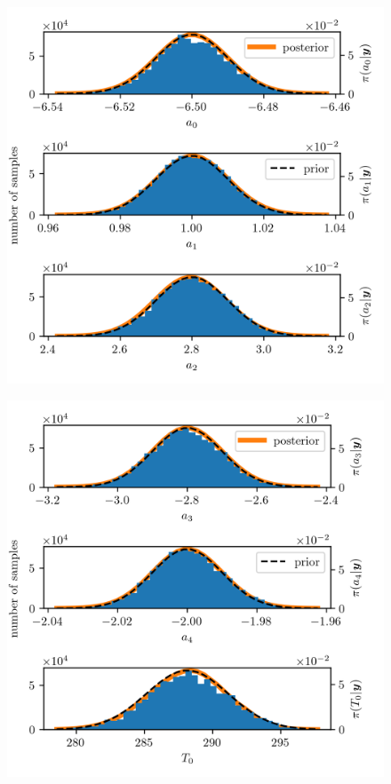 \begin{figure}[ht!]
	\centering
	\includegraphics{PHdPTPost2.png}
	\caption[]{}
	\label{fig:PostHistTT2}
\end{figure}
\begin{figure}[ht!]
	\centering
	\includegraphics{PHdPTPost3.png}
	\caption[]{}
	\label{fig:PostHistTT3}
\end{figure}
